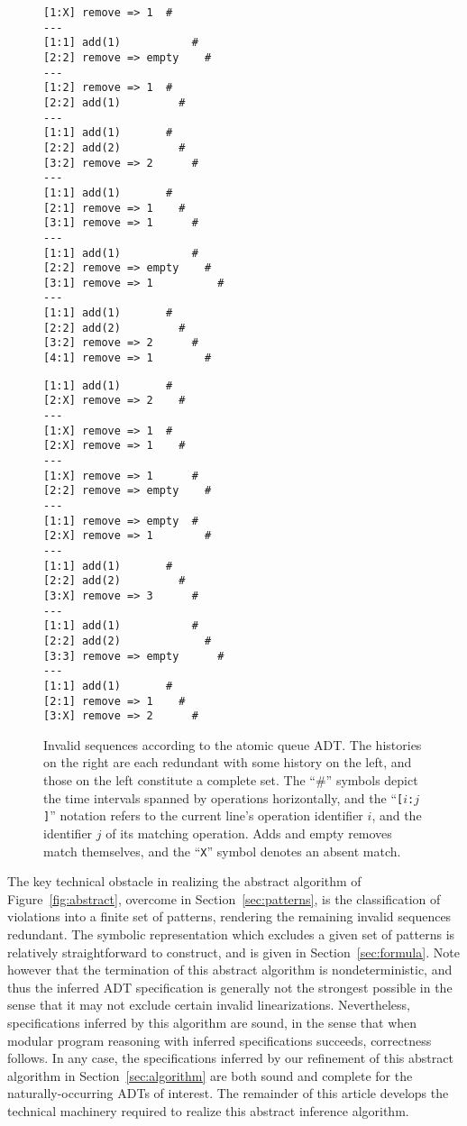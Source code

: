 \begin{figure}[t]
  \begin{minipage}[b]{0.49\linewidth}
    \begin{verbatim}
[1:X] remove => 1  #
---
[1:1] add(1)           #
[2:2] remove => empty    #
---
[1:2] remove => 1  #
[2:2] add(1)         #
---
[1:1] add(1)       #
[2:2] add(2)         #
[3:2] remove => 2      #
---
[1:1] add(1)       #
[2:1] remove => 1    #
[3:1] remove => 1      #
---
[1:1] add(1)           #
[2:2] remove => empty    #
[3:1] remove => 1          #
---
[1:1] add(1)       #
[2:2] add(2)         #
[3:2] remove => 2      #
[4:1] remove => 1        #
    \end{verbatim}
  \end{minipage}
  \hfill
  \begin{minipage}[b]{0.49\linewidth}
    \begin{verbatim}
[1:1] add(1)       #
[2:X] remove => 2    #
---
[1:X] remove => 1  #
[2:X] remove => 1    #
---
[1:X] remove => 1      #
[2:2] remove => empty    #
---
[1:1] remove => empty  #
[2:X] remove => 1        #
---
[1:1] add(1)       #
[2:2] add(2)         #
[3:X] remove => 3      #
---
[1:1] add(1)           #
[2:2] add(2)             #
[3:3] remove => empty      #
---
[1:1] add(1)       #
[2:1] remove => 1    #
[3:X] remove => 2      #
    \end{verbatim}
  \end{minipage}
  \caption{Invalid sequences according to the atomic queue ADT. The histories
  on the right are each redundant with some history on the left, and those on
  the left constitute a complete set. The “\#” symbols depict the time intervals
  spanned by operations horizontally, and the “{\tt [$i$:$j$]}” notation refers
  to the current line’s operation identifier $i$, and the identifier $j$ of
  its matching operation. Adds and empty removes match themselves, and the
  “{\tt X}” symbol denotes an absent match.}
  \label{fig:patterns}
\end{figure}

The key technical obstacle in realizing the abstract algorithm of
Figure~\ref{fig:abstract}, overcome in Section~\ref{sec:patterns}, is the
classification of violations into a finite set of patterns, rendering the
remaining invalid sequences redundant. The symbolic representation which
excludes a given set of patterns is relatively straightforward to construct, and
is given in Section~\ref{sec:formula}. Note however that the termination of this
abstract algorithm is nondeterministic, and thus the inferred ADT specification
is generally not the strongest possible in the sense that it may not exclude
certain invalid linearizations. Nevertheless, specifications inferred by this
algorithm are sound, in the sense that when modular program reasoning with
inferred specifications succeeds, correctness follows. In any case, the
specifications inferred by our refinement of this abstract algorithm in
Section~\ref{sec:algorithm} are both sound and complete for the
naturally-occurring ADTs of interest. The remainder of this article develops
the technical machinery required to realize this abstract inference algorithm.
